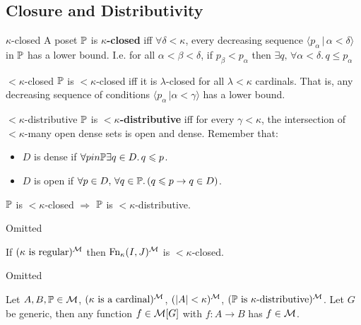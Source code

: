\documentclass{article}
\begin{document}
    \subsection{Closure and Distributivity}
    \begin{fancydefine}{$\kappa$-closed}
        A poset $\mathbb{P}$ is $\kappa$\textbf{-closed} iff $\forall \delta < \kappa$, every decreasing sequence $\langle p_{\alpha} \, | \, \alpha < \delta \rangle$ in $\mathbb{P}$ has a lower bound. \gap
        I.e. for all $\alpha < \beta < \delta$, if $p_{\beta}<p_{\alpha}$ then $\exists q, \, \forall \alpha < \delta.\, q \leq p_{\alpha}$
    \end{fancydefine}
    \begin{fancydefine}{$<\kappa$-closed}
        $\mathbb{P}$ is $<\kappa$-closed iff it is $\lambda$-closed for all $\lambda < \kappa$ cardinals. That is, any decreasing sequence of conditions $\langle p_{\alpha} \, | \alpha < \gamma \rangle$ has a lower bound.
    \end{fancydefine}
    \begin{fancydefine}{$<\kappa$-distributive}
        $\mathbb{P}$ is $<\kappa$\textbf{-distributive} iff for every $\gamma < \kappa$, the intersection of $<\kappa$-many open dense sets is open and dense. Remember that: \begin{itemize}
            \item $D$ is dense if $\forall p in \mathbb{P} \exists q \in D. \, q \leqslant p$.
            \item $D$ is open if $\forall p \in D, \, \forall q \in \mathbb{P}. \, (q \leqslant p \rightarrow q \in D)$.
        \end{itemize}
    \end{fancydefine}
    \begin{fancylem}{}
        $\mathbb{P}$ is $<\kappa$-closed $\Rightarrow$ $\mathbb{P}$ is $<\kappa$-distributive.
    \end{fancylem}
    \proof Omitted \endproof
    \begin{fancylem}
        If $(\kappa \text{ is regular})^{\mathcal{M}}$ then $\operatorname{Fn}_{\kappa}(I,J)^{\mathcal{M}}$ is $<\kappa$-closed.
    \end{fancylem}
    \proof Omitted \endproof
    \begin{fancythm}{}
        Let $A, B, \mathbb{P} \in \mathcal{M}$, $(\kappa \text{ is a cardinal})^{\mathcal{M}}$, $(|A| < \kappa)^{\mathcal{M}}$, $(\mathbb{P} \text{ is $\kappa$-distributive})^{\mathcal{M}}$. Let $G$ be generic, then any function $f \in \mathcal{M}[G]$ with $f : A \to B$ has $f \in \mathcal{M}$.
    \end{fancythm}
\end{document}
